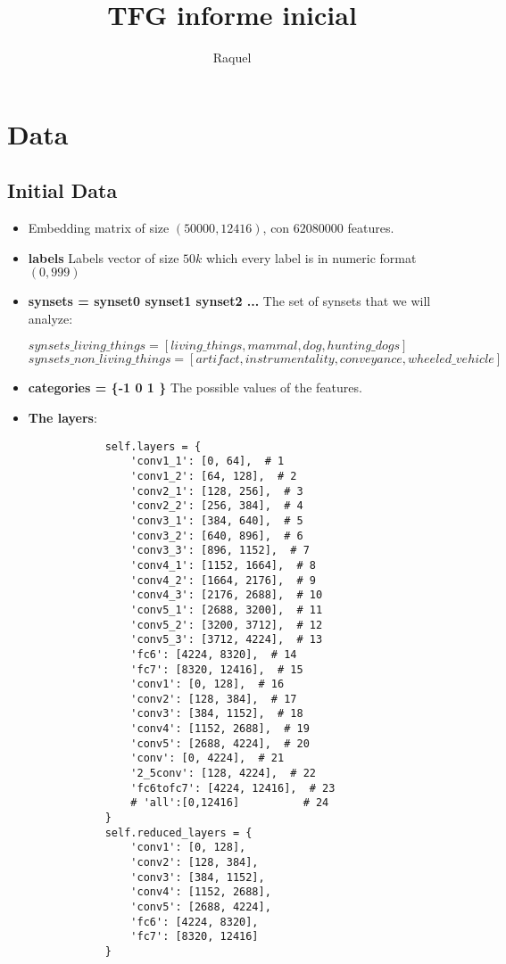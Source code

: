 \documentclass{article}
\title{TFG informe inicial}
\author{Raquel}
\begin{document}
\maketitle

\tableofcontents

\section{Data}
\subsection{Initial Data}
\begin{itemize}
	\item Embedding matrix of size $(50000, 12416)$, con $62080000$ features.
	\item \textbf{labels} Labels vector of size $50k$ which every label is in numeric format $(0,999)$
	\item \textbf{synsets = synset0 synset1 synset2 ...} The set of synsets that we will analyze: 
	      	      	      
	      $synsets\_living\_things = [living\_things, mammal, dog, hunting\_dogs]$
	      \newline
	      $synsets\_non\_living\_things = [artifact, instrumentality, conveyance, wheeled\_vehicle]$
	      	      	      
	\item \textbf{categories = \{-1 0 1 \}} The possible values of the features.
	\item \textbf{The layers}:
	      \begin{verbatim}
	      	self.layers = {
	      		'conv1_1': [0, 64],  # 1
	      		'conv1_2': [64, 128],  # 2
	      		'conv2_1': [128, 256],  # 3
	      		'conv2_2': [256, 384],  # 4
	      		'conv3_1': [384, 640],  # 5
	      		'conv3_2': [640, 896],  # 6
	      		'conv3_3': [896, 1152],  # 7
	      		'conv4_1': [1152, 1664],  # 8
	      		'conv4_2': [1664, 2176],  # 9
	      		'conv4_3': [2176, 2688],  # 10
	      		'conv5_1': [2688, 3200],  # 11
	      		'conv5_2': [3200, 3712],  # 12
	      		'conv5_3': [3712, 4224],  # 13
	      		'fc6': [4224, 8320],  # 14
	      		'fc7': [8320, 12416],  # 15
	      		'conv1': [0, 128],  # 16
	      		'conv2': [128, 384],  # 17
	      		'conv3': [384, 1152],  # 18
	      		'conv4': [1152, 2688],  # 19
	      		'conv5': [2688, 4224],  # 20
	      		'conv': [0, 4224],  # 21
	      		'2_5conv': [128, 4224],  # 22
	      		'fc6tofc7': [4224, 12416],  # 23
	      		# 'all':[0,12416]          # 24
	      	}
	      	self.reduced_layers = {
	      		'conv1': [0, 128],
	      		'conv2': [128, 384],
	      		'conv3': [384, 1152],
	      		'conv4': [1152, 2688],
	      		'conv5': [2688, 4224],
	      		'fc6': [4224, 8320],
	      		'fc7': [8320, 12416]
	      	}
	      \end{verbatim}
\end{itemize}
\end{document}
